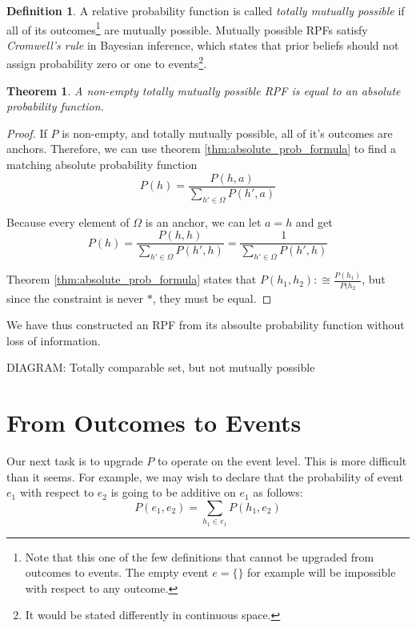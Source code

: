 \documentclass[twoside]{article}
\theoremstyle{plain}%
\newtheorem{theorem}{Theorem}[section]
\theoremstyle{definition}
\newtheorem{definition}{Definition}[section]
\theoremstyle{remark}
\begin{document}
\begin{definition}
A relative probability function is called \textit{totally mutually possible} if all of its outcomes\footnote{Note that this one of the few definitions that cannot be upgraded from outcomes to events. The empty event \(e = \{\}\) for example will be impossible with respect to any outcome.\cite{theorem:empty_event_impossible}} are mutually possible. Mutually possible RPFs satisfy \textit{Cromwell's rule} in Bayesian inference, which states that prior beliefs should not assign probability zero or one to events\footnote{It would be stated differently in continuous space.}.
\end{definition}

\begin{theorem}
A non-empty totally mutually possible RPF is equal to an absolute probability function.
\end{theorem}

\begin{proof}
If \(P\) is non-empty, and totally mutually possible, all of it's outcomes are anchors. Therefore, we can use theorem \ref{thm:absolute_prob_formula} to find a matching absolute probability function
\[P(h) = \frac{P(h, a)}{\sum_{h' \in \Omega}P(h', a)}\]

Because every element of \(\Omega\) is an anchor, we can let \(a = h\) and get
\[P(h) = \frac{P(h, h)}{\sum_{h' \in \Omega}P(h', h)}=\frac{1}{\sum_{h' \in \Omega}P(h', h)}\]

Theorem \ref{thm:absolute_prob_formula} states that \(P(h_1, h_2) :\cong \frac{P(h_1)}{P(h_2}\), but since the constraint is never \(\ast\), they must be equal.
\end{proof}

We have thus constructed an RPF from its absoulte probability function without loss of information.

DIAGRAM: Totally comparable set, but not mutually possible

\section{From Outcomes to Events}

Our next task is to upgrade \(P\) to operate on the event level. This is more difficult than it seems. For example, we may wish to declare that the probability of event \(e_1\) with respect to \(e_2\) is going to be additive on \(e_1\) as follows:
\begin{equation}
\label{eq:incorrect_additive_event_def}
P(e_1, e_2) = \sum_{h_1 \in e_1}P(h_1, e_2)
\end{equation}
\end{document}
